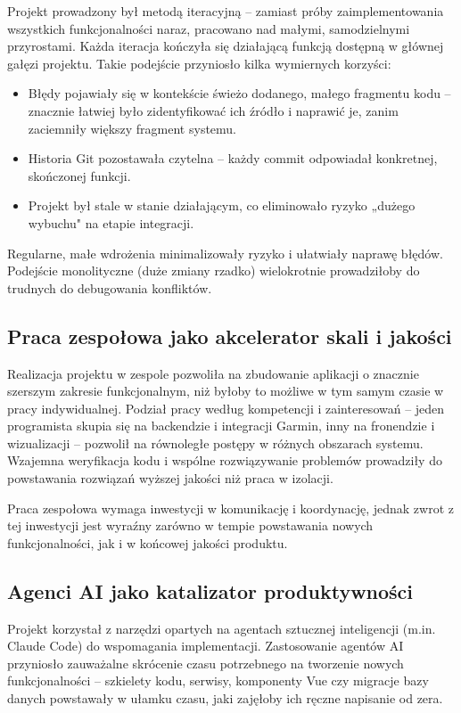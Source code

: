 \documentclass[12pt,a4paper]{report}
\begin{document}
Projekt prowadzony był metodą iteracyjną -- zamiast próby zaimplementowania wszystkich funkcjonalności naraz, pracowano nad małymi, samodzielnymi przyrostami. Każda iteracja kończyła się działającą funkcją dostępną w głównej gałęzi projektu. Takie podejście przyniosło kilka wymiernych korzyści:
\begin{itemize}
    \item Błędy pojawiały się w kontekście świeżo dodanego, małego fragmentu kodu -- znacznie łatwiej było zidentyfikować ich źródło i naprawić je, zanim zaciemniły większy fragment systemu.
    \item Historia Git pozostawała czytelna -- każdy commit odpowiadał konkretnej, skończonej funkcji.
    \item Projekt był stale w stanie działającym, co eliminowało ryzyko „dużego wybuchu" na etapie integracji.
\end{itemize}
Regularne, małe wdrożenia minimalizowały ryzyko i ułatwiały naprawę błędów. Podejście monolityczne (duże zmiany rzadko) wielokrotnie prowadziłoby do trudnych do debugowania konfliktów.

\subsection{Praca zespołowa jako akcelerator skali i jakości}

Realizacja projektu w zespole pozwoliła na zbudowanie aplikacji o znacznie szerszym zakresie funkcjonalnym, niż byłoby to możliwe w tym samym czasie w pracy indywidualnej. Podział pracy według kompetencji i zainteresowań -- jeden programista skupia się na backendzie i integracji Garmin, inny na fronendzie i wizualizacji -- pozwolił na równoległe postępy w różnych obszarach systemu. Wzajemna weryfikacja kodu i wspólne rozwiązywanie problemów prowadziły do powstawania rozwiązań wyższej jakości niż praca w izolacji.

Praca zespołowa wymaga inwestycji w komunikację i koordynację, jednak zwrot z tej inwestycji jest wyraźny zarówno w tempie powstawania nowych funkcjonalności, jak i w końcowej jakości produktu.

\subsection{Agenci AI jako katalizator produktywności}

Projekt korzystał z narzędzi opartych na agentach sztucznej inteligencji (m.in. Claude Code) do wspomagania implementacji. Zastosowanie agentów AI przyniosło zauważalne skrócenie czasu potrzebnego na tworzenie nowych funkcjonalności -- szkielety kodu, serwisy, komponenty Vue czy migracje bazy danych powstawały w ułamku czasu, jaki zajęłoby ich ręczne napisanie od zera.
\end{document}
